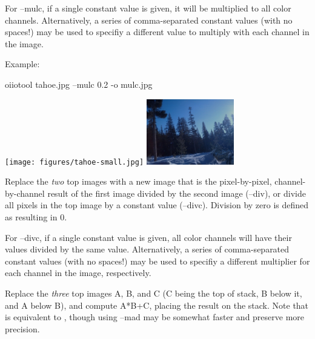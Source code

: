 For {\cf --mulc}, if a single constant value is given, it will be multiplied
to all color channels. Alternatively, a series of comma-separated constant
values (with no spaces!) may be used to specifiy a different value to
multiply with each channel in the image.

\noindent Example:
\begin{code}
    oiiotool tahoe.jpg --mulc 0.2 -o mulc.jpg
\end{code}
\spc \texttt{[image: figures/tahoe-small.jpg]}
\raisebox{40pt}{\large $\rightarrow$}
\includegraphics[width=1.5in]{figures/mulc.jpg} \\
\apiend

Replace the \emph{two} top images with a new image that is the
pixel-by-pixel, channel-by-channel result of the first image divided by
the second image ({\cf --div}), or divide all
pixels in the top image by a constant value ({\cf --divc}).
Division by zero is defined as resulting in 0.

For {\cf --divc}, if a single constant value is given, all color channels
will have their values divided by the same value.  Alternatively, a series
of comma-separated constant values (with no spaces!) may be used to specifiy
a different multiplier for each channel in the image, respectively.
\apiend

Replace the \emph{three} top images A, B, and C (C being the top of stack, B
below it, and A below B), and compute A*B+C, placing the result on the
stack. Note that  is equivalent to ,
though using {\cf --mad} may be somewhat faster and preserve more precision.

\apiend



